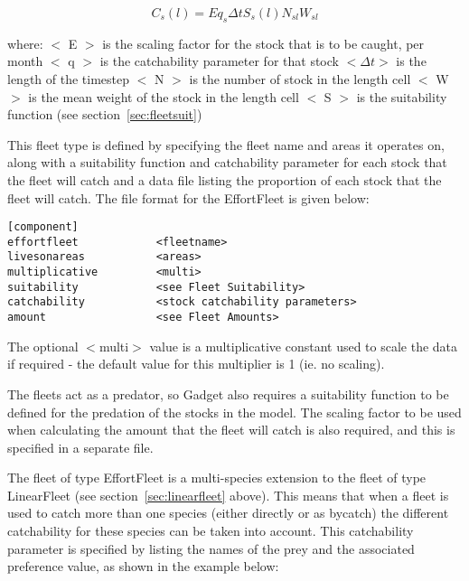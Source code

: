 \documentclass[10pt,twoside]{book}
\begin{document}
\begin{equation}\label{eq:econs}
C_{s}(l) = E q_{s} \Delta t S_{s}(l) N_{sl} W_{sl}
\end{equation}

where:\newline
$<$ E $>$ is the scaling factor for the stock that is to be caught, per month\newline
$<$ q $>$ is the catchability parameter for that stock\newline
$<\Delta t>$ is the length of the timestep\newline
$<$ N $>$ is the number of stock in the length cell\newline
$<$ W $>$ is the mean weight of the stock in the length cell\newline
$<$ S $>$ is the suitability function (see section~\ref{sec:fleetsuit})

\bigskip
This fleet type is defined by specifying the fleet name and areas it operates on, along with a suitability function and catchability parameter for each stock that the fleet will catch and a data file listing the proportion of each stock that the fleet will catch.  The file format for the EffortFleet is given below:

{\small\begin{verbatim}
[component]
effortfleet            <fleetname>
livesonareas           <areas>
multiplicative         <multi>
suitability            <see Fleet Suitability>
catchability           <stock catchability parameters>
amount                 <see Fleet Amounts>
\end{verbatim}}

The optional $<$multi$>$ value is a multiplicative constant used to scale the data if required - the default value for this multiplier is 1 (ie. no scaling).

\bigskip
The fleets act as a predator, so Gadget also requires a suitability function to be defined for the predation of the stocks in the model.  The scaling factor to be used when calculating the amount that the fleet will catch is also required, and this is specified in a separate file.

\bigskip
The fleet of type EffortFleet is a multi-species extension to the fleet of type LinearFleet (see section~\ref{sec:linearfleet} above).  This means that when a fleet is used to catch more than one species (either directly or as bycatch) the different catchability for these species can be taken into account.  This catchability parameter is specified by listing the names of the prey and the associated preference value, as shown in the example below:
\end{document}
